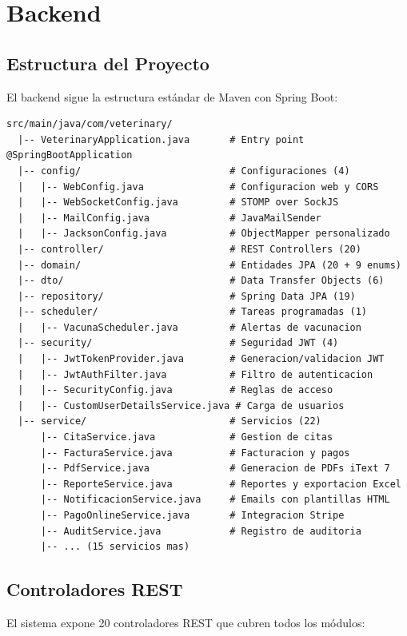 \chapter{Backend}

\section{Estructura del Proyecto}

El backend sigue la estructura est\'andar de Maven con Spring Boot:

\begin{verbatim}
src/main/java/com/veterinary/
  |-- VeterinaryApplication.java       # Entry point @SpringBootApplication
  |-- config/                          # Configuraciones (4)
  |   |-- WebConfig.java               # Configuracion web y CORS
  |   |-- WebSocketConfig.java         # STOMP over SockJS
  |   |-- MailConfig.java              # JavaMailSender
  |   |-- JacksonConfig.java           # ObjectMapper personalizado
  |-- controller/                      # REST Controllers (20)
  |-- domain/                          # Entidades JPA (20 + 9 enums)
  |-- dto/                             # Data Transfer Objects (6)
  |-- repository/                      # Spring Data JPA (19)
  |-- scheduler/                       # Tareas programadas (1)
  |   |-- VacunaScheduler.java         # Alertas de vacunacion
  |-- security/                        # Seguridad JWT (4)
  |   |-- JwtTokenProvider.java        # Generacion/validacion JWT
  |   |-- JwtAuthFilter.java           # Filtro de autenticacion
  |   |-- SecurityConfig.java          # Reglas de acceso
  |   |-- CustomUserDetailsService.java # Carga de usuarios
  |-- service/                         # Servicios (22)
      |-- CitaService.java             # Gestion de citas
      |-- FacturaService.java          # Facturacion y pagos
      |-- PdfService.java              # Generacion de PDFs iText 7
      |-- ReporteService.java          # Reportes y exportacion Excel
      |-- NotificacionService.java     # Emails con plantillas HTML
      |-- PagoOnlineService.java       # Integracion Stripe
      |-- AuditService.java            # Registro de auditoria
      |-- ... (15 servicios mas)
\end{verbatim}

\section{Controladores REST}

El sistema expone 20 controladores REST que cubren todos los m\'odulos:


